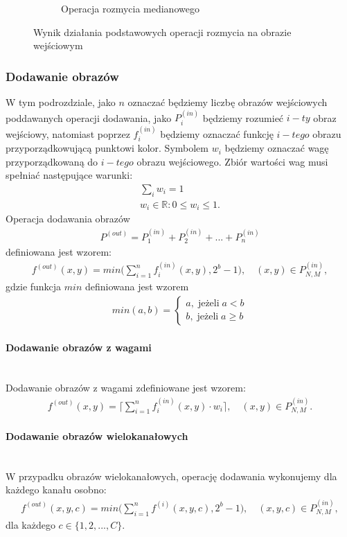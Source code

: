 \begin{figure}
\begin{subfigure}[b]{0.45\textwidth}
    \caption{Operacja rozmycia medianowego}
    \label{fig:smooth_lena_gauss}
  \end{subfigure}
  \caption{Wynik działania podstawowych operacji rozmycia na obrazie wejściowym}
  \label{fig:lena_smooth}
\end{figure}
\subsubsection{Dodawanie obrazów}
W tym podrozdziale, jako $n$ oznaczać będziemy liczbę obrazów wejściowych poddawanych operacji dodawania, jako $P^{(in)}_{i}$ będziemy rozumieć $i-ty$ obraz wejściowy, natomiast poprzez $f^{(in)}_i$ będziemy oznaczać funkcję $i-tego$ obrazu przyporządkowującą punktowi kolor. Symbolem $w_i$ będziemy oznaczać wagę przyporządkowaną do $i-tego$ obrazu wejściowego. Zbiór wartości wag  musi spełniać następujące warunki:
\begin{gather*}
  \displaystyle\sum_i w_i = 1\\
  w_i \in \mathbb{R}: 0 \leqslant w_i \leqslant 1.
\end{gather*}
Operacja dodawania obrazów 
\begin{gather*}
P^{(out)} = P_1^{(in)} + P_2^{(in)} + ... + P_n^{(in)}
\end{gather*}
definiowana jest wzorem:
\begin{gather*}
  f^{(out)}(x, y) = min\big(\displaystyle\sum_{i=1}^{n} f^{(in)}_i(x, y), 2^b-1\big), \quad (x, y) \in P^{(in)}_{N,M},
\end{gather*} gdzie funkcja $min$ definiowana jest wzorem
\begin{gather*}
  min(a, b) = \left\{\begin{matrix}
  a, \; \text{jeżeli} \; a < b \\
  b, \; \text{jeżeli} \; a \geqslant b
  \end{matrix}\right. 
\end{gather*}
\paragraph{Dodawanie obrazów z wagami} \mbox{}\\
Dodawanie obrazów z wagami zdefiniowane jest wzorem:
\begin{gather*}
  f^{(out)}(x, y) = \big\lceil \displaystyle\sum_{i=1}^{n} f^{(in)}_i(x, y) \cdot w_i\big\rceil, \quad (x, y) \in P^{(in)}_{N,M}.
\end{gather*}
\paragraph{Dodawanie obrazów wielokanałowych} \mbox{}\\
W przypadku obrazów wielokanałowych, operację dodawania wykonujemy dla każdego kanału osobno:
\begin{gather*}
  f^{(out)}(x, y, c) = min\big(\displaystyle\sum_{i=1}^{n} f^{(i)}(x, y, c), 2^b-1\big), \quad (x, y, c) \in P^{(in)}_{N,M},
\end{gather*}
dla każdego $c \in \{1, 2, ..., C\}$.
